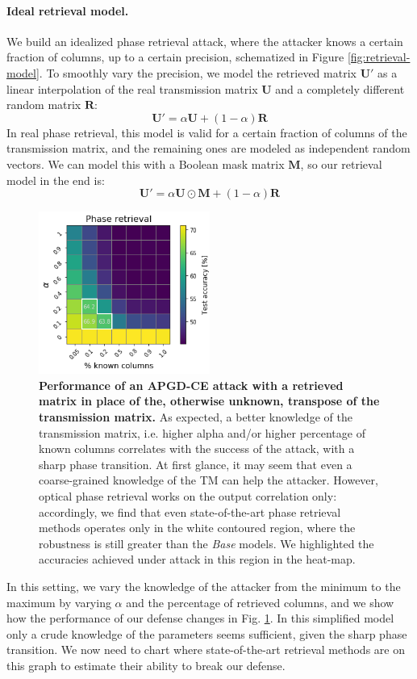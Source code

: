 \paragraph{Ideal retrieval model.} We build an idealized phase retrieval attack, where the attacker knows a certain fraction of columns, up to a certain precision, schematized in Figure \ref{fig:retrieval-model}. To smoothly vary the precision, we model the retrieved matrix $\mathbf{U'}$ as a linear interpolation of the real transmission matrix $\mathbf{U}$ and a completely different random matrix $\mathbf{R}$:
\begin{equation}
    \mathbf{U'} = \alpha\mathbf{U} + (1-\alpha)\mathbf{R}
\end{equation}
In real phase retrieval, this model is valid for a certain fraction of columns of the transmission matrix, and the remaining ones are modeled as independent random vectors. We can model this with a Boolean mask matrix $\mathbf{M}$, so our retrieval model in the end is:
\begin{equation}
    \mathbf{U'} = \alpha\mathbf{U}\odot\mathbf{M} + (1-\alpha)\mathbf{R}
\end{equation}
\begin{figure}
    \centering
    \includegraphics[width=0.5\textwidth]{sections/appendix/ropust_icassp2022/phase_retrieval.png}
    \caption{\textbf{Performance of an APGD-CE attack with a retrieved matrix in place of the, otherwise unknown, transpose of the transmission matrix.} As expected, a better knowledge of the transmission matrix, i.e. higher alpha and/or higher percentage of known columns correlates with the success of the attack, with a sharp phase transition. At first glance, it may seem that even a coarse-grained knowledge of the TM can help the attacker. However, optical phase retrieval works on the output correlation only: accordingly, we find that even state-of-the-art phase retrieval methods operates only in the white contoured region, where the robustness is still greater than the \textit{Base} models. We highlighted the accuracies achieved under attack in this region in the heat-map.}
    \label{fig:phase_retrieval}
\end{figure}
In this setting, we vary the knowledge of the attacker from the minimum to the maximum by varying $\alpha$ and the percentage of retrieved columns, and we show how the performance of our defense changes in Fig. \ref{fig:phase_retrieval}. In this simplified model only a crude knowledge of the parameters seems sufficient, given the sharp phase transition. We now need to chart where state-of-the-art retrieval methods are on this graph to estimate their ability to break our defense.

